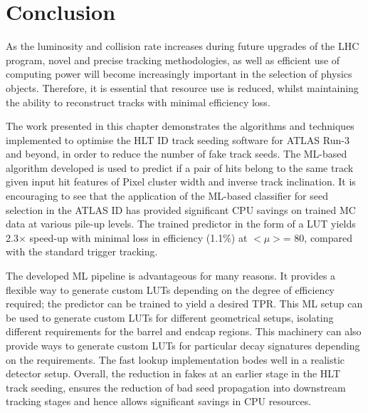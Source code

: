 \section{Conclusion}

As the luminosity and collision rate increases during future upgrades of the LHC program, novel and precise tracking methodologies, as well as efficient use of computing power will become increasingly important in the selection of physics objects. Therefore, it is essential that resource use is reduced, whilst maintaining the ability to reconstruct tracks with minimal efficiency loss. 

The work presented in this chapter demonstrates the algorithms and techniques implemented to optimise the HLT ID track seeding software for ATLAS Run-3 and beyond, in order to reduce the number of fake track seeds. The ML-based algorithm developed is used to predict if a pair of hits belong to the same track given input hit features of Pixel cluster width and inverse track inclination. It is encouraging to see that the application of the ML-based classifier for seed selection in the ATLAS ID has provided significant CPU savings on trained MC data at various pile-up levels. The trained predictor in the form of a LUT yields 2.3$\times$ speed-up with minimal loss in efficiency (1.1\%) at $< \mu >$= 80, compared with the standard trigger tracking. 

The developed ML pipeline is advantageous for many reasons. It provides a flexible way to generate custom LUTs depending on the degree of efficiency required; the predictor can be trained to yield a desired TPR. This ML setup can be used to generate custom LUTs for different geometrical setups, isolating different requirements for the barrel and endcap regions. This machinery can also provide ways to generate custom LUTs for particular decay signatures depending on the requirements. The fast lookup implementation bodes well in a realistic detector setup. Overall, the reduction in fakes at an earlier stage in the HLT track seeding, ensures the reduction of bad seed propagation into downstream tracking stages and hence allows significant savings in CPU resources.


